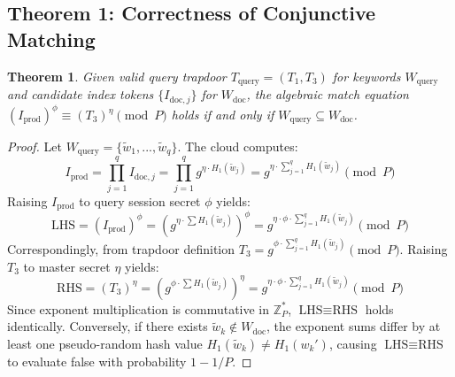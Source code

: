 \documentclass[journal,10pt,twocolumn]{IEEEtran}
\newtheorem{theorem}{Theorem}
\begin{document}
\subsection{Theorem 1: Correctness of Conjunctive Matching}
\begin{theorem}
Given valid query trapdoor $T_{\text{query}} = (T_1, T_3)$ for keywords $W_{\text{query}}$ and candidate index tokens $\{I_{\text{doc},j}\}$ for $W_{\text{doc}}$, the algebraic match equation $(I_{\text{prod}})^\phi \equiv (T_3)^\eta \pmod P$ holds if and only if $W_{\text{query}} \subseteq W_{\text{doc}}$.
\end{theorem}
\begin{proof}
Let $W_{\text{query}} = \{\tilde{w}_1, ..., \tilde{w}_q\}$. The cloud computes:
\begin{equation}
I_{\text{prod}} = \prod_{j=1}^q I_{\text{doc},j} = \prod_{j=1}^q g^{\eta \cdot H_1(\tilde{w}_j)} = g^{\eta \cdot \sum_{j=1}^q H_1(\tilde{w}_j)} \pmod P
\end{equation}
Raising $I_{\text{prod}}$ to query session secret $\phi$ yields:
\begin{equation}
\text{LHS} = (I_{\text{prod}})^\phi = (g^{\eta \cdot \sum H_1(\tilde{w}_j)})^\phi = g^{\eta \cdot \phi \cdot \sum_{j=1}^q H_1(\tilde{w}_j)} \pmod P
\end{equation}
Correspondingly, from trapdoor definition $T_3 = g^{\phi \cdot \sum_{j=1}^q H_1(\tilde{w}_j)} \pmod P$. Raising $T_3$ to master secret $\eta$ yields:
\begin{equation}
\text{RHS} = (T_3)^\eta = (g^{\phi \cdot \sum H_1(\tilde{w}_j)})^\eta = g^{\eta \cdot \phi \cdot \sum_{j=1}^q H_1(\tilde{w}_j)} \pmod P
\end{equation}
Since exponent multiplication is commutative in $\mathbb{Z}_P^*$, $\text{LHS} \equiv \text{RHS}$ holds identically. Conversely, if there exists $\tilde{w}_k \notin W_{\text{doc}}$, the exponent sums differ by at least one pseudo-random hash value $H_1(\tilde{w}_k) \neq H_1(w_k')$, causing $\text{LHS} \equiv \text{RHS}$ to evaluate false with probability $1 - 1/P$.
\end{proof}
\end{document}

